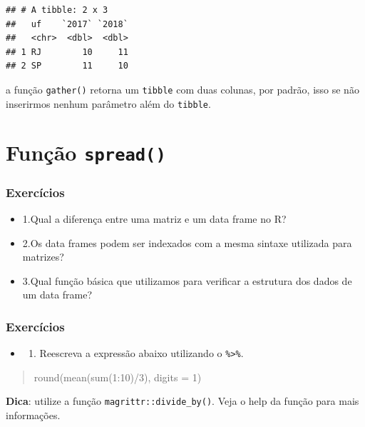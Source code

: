 \documentclass[]{book}
\providecommand{\tightlist}{%
  \setlength{\itemsep}{0pt}\setlength{\parskip}{0pt}}
\begin{document}
\begin{verbatim}
## # A tibble: 2 x 3
##   uf    `2017` `2018`
##   <chr>  <dbl>  <dbl>
## 1 RJ        10     11
## 2 SP        11     10
\end{verbatim}

a função \texttt{gather()} retorna um \texttt{tibble} com duas colunas, por padrão, isso se não inserirmos nenhum parâmetro além do \texttt{tibble}.

\hypertarget{funcao-spread}{%
\chapter{\texorpdfstring{Função \texttt{spread()}}{Função spread()}}\label{funcao-spread}}

\hypertarget{exercicios}{%
\subsection{Exercícios}\label{exercicios}}

\begin{itemize}
\tightlist
\item
  1.Qual a diferença entre uma matriz e um data frame no R?
\item
  2.Os data frames podem ser indexados com a mesma sintaxe utilizada para matrizes?
\item
  3.Qual função básica que utilizamos para verificar a estrutura dos dados de um data frame?
\end{itemize}

\hypertarget{exercicios-1}{%
\subsection{Exercícios}\label{exercicios-1}}

\begin{itemize}
\item
  \begin{enumerate}
  \def\labelenumi{\arabic{enumi}.}
  \tightlist
  \item
    Reescreva a expressão abaixo utilizando o \texttt{\%\textgreater{}\%}.
  \end{enumerate}
\end{itemize}

\begin{quote}
round(mean(sum(1:10)/3), digits = 1)
\end{quote}

\textbf{Dica}: utilize a função \texttt{magrittr::divide\_by()}. Veja o help da função para mais informações.
\end{document}
